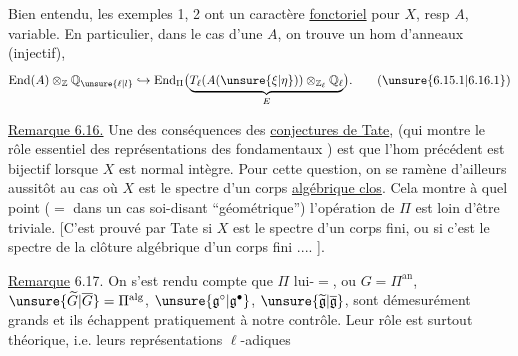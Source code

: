 Bien entendu, les exemples 1, 2  ont un caractère \uline{fonctoriel} pour $X$, resp $A$, variable. En particulier, dans le cas d'une $A$, on trouve un hom d'anneaux (injectif),
\[
\operatorname{End}(A)\otimes_{\mathbb{Z}}\mathbb{Q}_{\unsure{\ell|l}}\hookrightarrow\operatorname{End}_{\Pi}\bigl(\underbrace{T_\ell(A(\unsure{\xi|\eta}))\otimes_{\mathbb{Z}_\ell}\mathbb{Q}_\ell}_{E}\bigr).
\tag*{(\unsure{6.15.1|6.16.1})}
\]

\uline{Remarque 6.16.} Une des conséquences des \uline{conjectures de Tate}, (qui montre le rôle essentiel des représentations  des  fondamentaux  ) est que l'hom précédent est bijectif  lorsque $X$ est normal intègre. Pour cette question, on se ramène d'ailleurs aussitôt au cas où $X$ est le spectre d'un corps \uline{algébrique clos}. Cela montre à quel point ($=$ dans un cas soi-disant ``géométrique'') l'opération de $\Pi$ est loin d'être triviale. [C'est prouvé par Tate si $X$ est le spectre d'un corps fini,  ou   si c'est le spectre de la clôture algébrique d'un corps fini .... ].

\uline{Remarque} 6.17. On s'est rendu compte que $\Pi$ lui-$=$, ou $G=\Pi^{\mathrm{an}}$, $\unsure{\widetilde G|\overline G}=\Pi^{\mathrm{alg}}$, $\unsure{\mathfrak g^\circ|\mathfrak g^\bullet}$, $\unsure{\widetilde{\mathfrak g}|\overline{\mathfrak g}}$, sont démesurément grands et ils échappent pratiquement à notre contrôle. Leur rôle est surtout théorique, i.e. leurs représentations $\ell$-adiques
